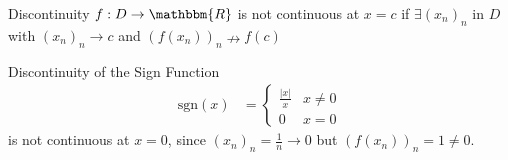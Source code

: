 \documentclass[10pt]{extarticle}
\newcommand{\R}{\mathbbm{R}}
\begin{document}
  \begin{problem}{Discontinuity}
    $f: D\rightarrow \R$ is not continuous at $x = c$ if $\exists (x_n)_n$ in $D$ with $(x_n)_n \rightarrow c$ and $(f(x_n))_n \nrightarrow f(c)$
  \end{problem}
  \begin{problem}{Discontinuity of the Sign Function}
    \begin{align*}
      \text{sgn}(x) &= \begin{cases}
        \frac{|x|}{x} & x\neq 0\\
        0 & x = 0
      \end{cases}
    \end{align*}
    is not continuous at $x = 0$, since $(x_n)_n = \frac{1}{n} \rightarrow 0$ but $(f(x_n))_n = 1 \neq 0$.
  \end{problem}
\end{document}
